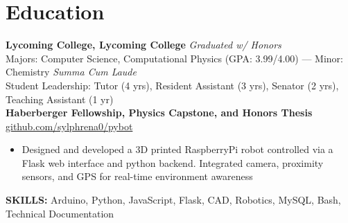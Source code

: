 \documentclass[11pt]{article}       %
\begin{document}


\vspace{-18.5pt}

\section*{Education}
\textbf{Lycoming College, Lycoming College} \hfill \textit{Graduated w/ Honors} \\
Majors: Computer Science, Computational Physics (GPA: 3.99/4.00) --- Minor: Chemistry \hfill \textit{Summa Cum Laude} \\
Student Leadership: Tutor (4 yrs), Resident Assistant (3 yrs), Senator (2 yrs), Teaching Assistant (1 yr) \\

\vspace{9pt}
\textbf{Haberberger Fellowship, Physics Capstone, and Honors Thesis} \hfill \href{https://github.com/sylphrena0/pybot}{github.com/sylphrena0/pybot} \\
\vspace{-9pt}
\begin{itemize}[leftmargin=0.35in]
  \item Designed and developed a 3D printed RaspberryPi robot controlled via a Flask web interface and python backend. Integrated camera, proximity sensors, and GPS for real-time environment awareness
\end{itemize}
\vspace{-9pt}
\textbf{SKILLS:} Arduino, Python, JavaScript, Flask, CAD, Robotics, MySQL, Bash, Technical Documentation
\vspace{9pt}
\end{document}
